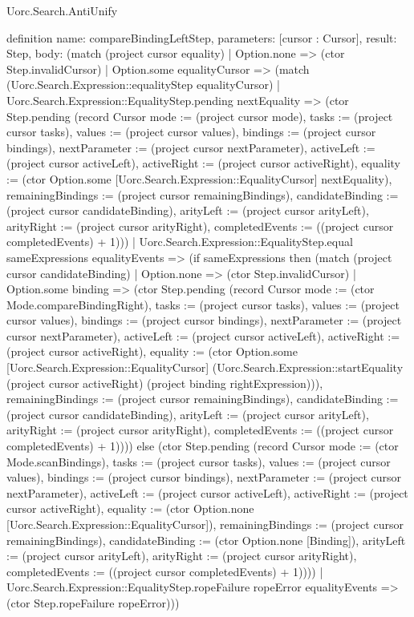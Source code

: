 \begin{lexlean}{Uorc.Search.AntiUnify}
\begin{semanticmodule}
definition{
  name: compareBindingLeftStep,
  parameters: [cursor : Cursor],
  result: Step,
  body: (match (project cursor equality)
    | Option.none => (ctor Step.invalidCursor)
    | Option.some equalityCursor => (match (Uorc.Search.Expression::equalityStep equalityCursor)
      | Uorc.Search.Expression::EqualityStep.pending nextEquality => (ctor Step.pending (record Cursor {mode := (project cursor mode), tasks := (project cursor tasks), values := (project cursor values), bindings := (project cursor bindings), nextParameter := (project cursor nextParameter), activeLeft := (project cursor activeLeft), activeRight := (project cursor activeRight), equality := (ctor Option.some [Uorc.Search.Expression::EqualityCursor] nextEquality), remainingBindings := (project cursor remainingBindings), candidateBinding := (project cursor candidateBinding), arityLeft := (project cursor arityLeft), arityRight := (project cursor arityRight), completedEvents := ((project cursor completedEvents) + 1)}))
      | Uorc.Search.Expression::EqualityStep.equal sameExpressions equalityEvents => (if sameExpressions then (match (project cursor candidateBinding)
        | Option.none => (ctor Step.invalidCursor)
        | Option.some binding => (ctor Step.pending (record Cursor {mode := (ctor Mode.compareBindingRight), tasks := (project cursor tasks), values := (project cursor values), bindings := (project cursor bindings), nextParameter := (project cursor nextParameter), activeLeft := (project cursor activeLeft), activeRight := (project cursor activeRight), equality := (ctor Option.some [Uorc.Search.Expression::EqualityCursor] (Uorc.Search.Expression::startEquality (project cursor activeRight) (project binding rightExpression))), remainingBindings := (project cursor remainingBindings), candidateBinding := (project cursor candidateBinding), arityLeft := (project cursor arityLeft), arityRight := (project cursor arityRight), completedEvents := ((project cursor completedEvents) + 1)}))) else (ctor Step.pending (record Cursor {mode := (ctor Mode.scanBindings), tasks := (project cursor tasks), values := (project cursor values), bindings := (project cursor bindings), nextParameter := (project cursor nextParameter), activeLeft := (project cursor activeLeft), activeRight := (project cursor activeRight), equality := (ctor Option.none [Uorc.Search.Expression::EqualityCursor]), remainingBindings := (project cursor remainingBindings), candidateBinding := (ctor Option.none [Binding]), arityLeft := (project cursor arityLeft), arityRight := (project cursor arityRight), completedEvents := ((project cursor completedEvents) + 1)})))
      | Uorc.Search.Expression::EqualityStep.ropeFailure ropeError equalityEvents => (ctor Step.ropeFailure ropeError)))
}


\end{semanticmodule}
\end{lexlean}
